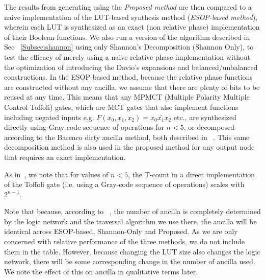 The results from generating using the {\it Proposed method} are then compared to a naive implementation of the
LUT-based synthesis method ({\it ESOP-based method}), wherein each LUT is synthesized as an exact
(non relative phase) implementation of their Boolean functions. We also run a version of the algorithm described
in Sec ~\ref{Subsec:shannon} using only Shannon's Decomposition (Shannon Only), to test the efficacy of merely
using a naive relative phase implementation without the optimization of introducing the Davio's expansions and
balanced/unbalanced constructions. In the ESOP-based method, because the relative phase functions are constructed
without any ancilla, we assume that there are plenty of bits to be reused at any time. This means that any
MPMCT (Multiple Polarity Multiple Control Toffoli) gates, which are MCT gates that also implement functions
including negated inputs e.g. $F(x_0,x_1,x_2)=x_0\bar{x_1}x_2$ etc., are synthesized directly using Gray-code sequence of
operations for $n<5$, or decomposed according to the Barenco dirty ancilla method, both described in
~\cite{bib-barenco-elementary}. This same decomposition method is also used in the proposed method for any output
node that requires an exact implementation.

As in~\cite{bib-barenco-elementary}, we note that for values of $n<5$, the T-count in a direct implementation of
the Toffoli gate (i.e. using a Gray-code sequence of operations) scales with $2^{n-1}$.

Note that because, according to ~\cite{bib-lhrs-soeken}, the number of ancilla is completely determined by the logic
network and the traversal algorithm we use there, the ancilla will be identical across ESOP-based, Shannon-Only
and Proposed. As we are only concerned with relative performance of the three methods, we do not include them
in the table. However, because changing the LUT size also changes the logic network, there will be some
corresponding change in the number of ancilla used. We note the effect of this on ancilla in qualitative terms
later.

